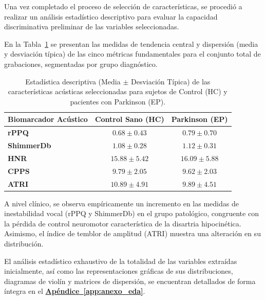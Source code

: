         Una vez completado el proceso de selección de características, se procedió a realizar un análisis estadístico descriptivo para evaluar la capacidad discriminativa preliminar de las variables seleccionadas. 

        En la Tabla~\ref{tab:medias_acusticas} se presentan las medidas de tendencia central y dispersión (media y desviación típica) de las cinco métricas fundamentales para el conjunto total de grabaciones, segmentadas por grupo diagnóstico.

        \begin{table}[H]
            \centering
            \renewcommand{\arraystretch}{1.3}
            \begin{tabularx}{0.8\textwidth}{>{\raggedright\arraybackslash}X c c}
                \toprule
                \textbf{Biomarcador Acústico} & \textbf{Control Sano (HC)} & \textbf{Parkinson (EP)} \\
                \midrule
                \textbf{rPPQ} & $0.68 \pm 0.43$ & $0.79 \pm 0.70$ \\
                \textbf{ShimmerDb} & $1.08 \pm 0.28$ & $1.12 \pm 0.31$ \\
                \textbf{HNR} & $15.88 \pm 5.42$ & $16.09 \pm 5.88$ \\
                \textbf{CPPS} & $9.79 \pm 2.05$ & $9.62 \pm 2.03$ \\
                \textbf{ATRI} & $10.89 \pm 4.91$ & $9.89 \pm 4.51$ \\
                \bottomrule
            \end{tabularx}
            \caption{Estadística descriptiva (Media $\pm$ Desviación Típica) de las características acústicas seleccionadas para sujetos de Control (HC) y pacientes con Parkinson (EP).}
            \label{tab:medias_acusticas}
        \end{table}

        A nivel clínico, se observa empíricamente un incremento en las medidas de inestabilidad vocal (rPPQ y ShimmerDb) en el grupo patológico, congruente con la pérdida de control neuromotor característica de la disartria hipocinética. Asimismo, el índice de temblor de amplitud (ATRI) muestra una alteración en su distribución. 

        El análisis estadístico exhaustivo de la totalidad de las variables extraídas inicialmente, así como las representaciones gráficas de sus distribuciones, diagramas de violín y matrices de dispersión, se encuentran detallados de forma íntegra en el \textbf{\hyperref[app:anexo_eda]{Apéndice~\ref*{app:anexo_eda}}}.


